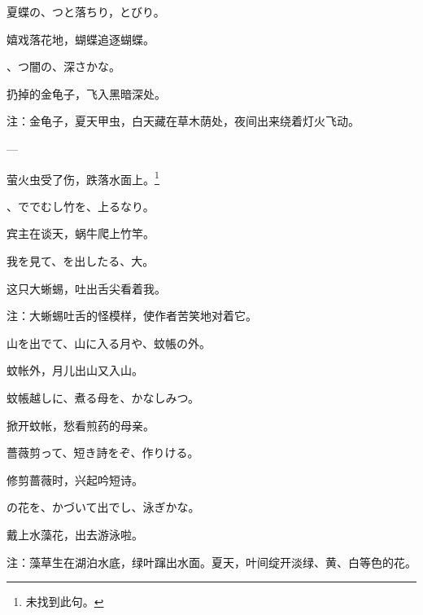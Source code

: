 \begin{haiku}
    {\FH 夏蝶の、つと落ちり，とびり。}

    {\FK 嬉戏落花地，蝴蝶追逐蝴蝶。}
\end{haiku}

\begin{haiku}
    {\FH {}、つ闇の、深さかな。}

    {\FK 扔掉的金龟子，飞入黑暗深处。}

    {\FT 注：金龟子，夏天甲虫，白天藏在草木荫处，夜间出来绕着灯火飞动。}
\end{haiku}

\begin{haiku}
    {\FH ---}

    {\FK 萤火虫受了伤，跌落水面上。\footnote{\FT 未找到此句。}}
\end{haiku}

\begin{haiku}
    {\FH {}、ででむし竹を、上るなり。}

    {\FK 宾主在谈天，蜗牛爬上竹竿。}
\end{haiku}

\begin{haiku}
    {\FH 我を見て、を出したる、大。}

    {\FK 这只大蜥蜴，吐出舌尖看着我。}

    {\FT 注：大蜥蜴吐舌的怪模样，使作者苦笑地对着它。}
\end{haiku}

\begin{haiku}
    {\FH 山を出でて、山に入る月や、蚊帳の外。}

    {\FK 蚊帐外，月儿出山又入山。}
\end{haiku}

\begin{haiku}
    {\FH 蚊帳越しに、煮る母を、かなしみつ。}

    {\FK 掀开蚊帐，愁看煎药的母亲。}
\end{haiku}

\begin{haiku}
    {\FH 薔薇剪って、短き詩をぞ、作りける。}

    {\FK 修剪蔷薇时，兴起吟短诗。}
\end{haiku}

\begin{haiku}
    {\FH {}の花を、かづいて出でし、泳ぎかな。}

    {\FK 戴上水藻花，出去游泳啦。}

    {\FT 注：藻草生在湖泊水底，绿叶蹿出水面。夏天，叶间绽开淡绿、黄、白等色的花。}
\end{haiku}

